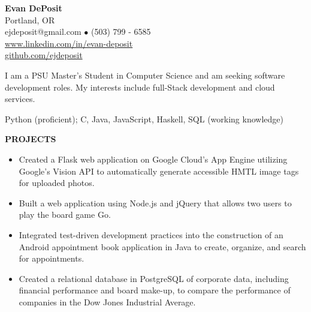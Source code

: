 \documentclass[11pt]{article}
\begin{document}
\thispagestyle{empty}
\begin{center}
\noindent \Large{\textbf{Evan DePosit}}\\
\large{Portland, OR}\\
\large{ejdeposit@gmail.com $\bullet$ (503) 799 - 6585}\\
\href{http://www.linkedin.com/in/evan-deposit}{\large{www.linkedin.com/in/evan-deposit}}\\
\href{http://github.com/ejdeposit}{\large{github.com/ejdeposit}}
\end{center}
\medskip
\begin{description}[style=multiline,leftmargin=3.2cm,font=\normalfont]
\item[\textbf{OBJECTIVE:}] I am a PSU Master's Student in Computer Science and am seeking software development roles. My interests include full-Stack development and cloud services.
\item[\textbf{LANGUAGES:}] Python (proficient); C, Java, JavaScript, Haskell, SQL (working knowledge)
\end{description}
\noindent
\makebox[0pt][l]{\rule[-.2\baselineskip]{\linewidth}{.3mm}}\large{\textbf{PROJECTS}}
\begin{itemize}[leftmargin=*, itemsep=0pt, topsep=5pt]
	\item Created a Flask web application on Google Cloud’s App Engine utilizing Google’s Vision API to automatically generate accessible HMTL image tags for uploaded photos.
	\item Built a web application using Node.js and jQuery that allows two users to play the board game Go.
	\item Integrated test-driven development practices into the construction of an Android appointment book application in Java to create, organize, and search for appointments.
	\item Created a relational database in PostgreSQL of corporate data, including financial performance and board make-up, to compare the performance of companies in the Dow Jones Industrial Average.
\end{itemize} 
\end{document}
